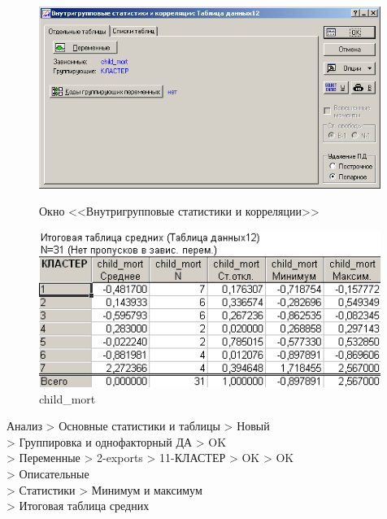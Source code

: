 \begin{figure}[!h]
  \centering
  \begin{minipage}{0.49\textwidth}
    \centering

    \includegraphics[width=0.99\textwidth]
    {inc/cars_my/var5__3_6.PNG}

    \caption{Окно <<Внутригрупповые статистики и корреляции>>}
    \label{fig:var5__3_6}
  \end{minipage}
  \begin{minipage}{0.49\textwidth}
    \centering

    \includegraphics[width=0.99\textwidth]
    {inc/cars_my/var5__3_7.PNG}

    \caption{child\_mort}
    \label{fig:var5__3_7}
  \end{minipage}
\end{figure}

Анализ > Основные статистики и таблицы > Новый\\
> Группировка и однофакторный ДА > OK\\
> Переменные > 2-exports > 11-КЛАСТЕР > OK > OK\\
> Описательные\\
> Статистики > Минимум и максимум\\
> Итоговая таблица средних

